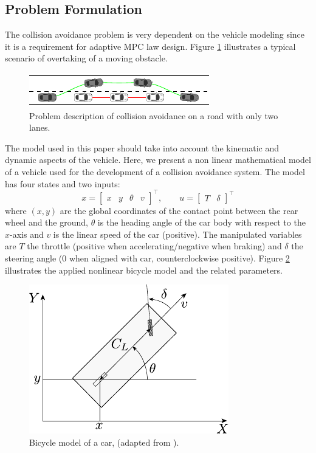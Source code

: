 \documentclass[conference,11pt]{IEEEtran}
\renewcommand{\vec}[1]{\ensuremath{\boldsymbol{\mathit{#1}}}}
\begin{document}
\subsection{Problem Formulation}
The collision avoidance problem is very dependent on the vehicle modeling since it is a requirement for  adaptive MPC law design. Figure \ref{fig:obstacleAvoidance} illustrates a typical scenario of overtaking of a moving obstacle.
\begin{figure}[H]
	\centering
	\includegraphics[width=1\columnwidth]{./figure/obstacleAvoidance/obstacleAvoidance.pdf}
	\caption{Problem description of collision avoidance on a road with only two lanes.}
	\label{fig:obstacleAvoidance}
\end{figure}
The model used in this paper should take into account the kinematic and dynamic aspects of the vehicle. Here, we present a non linear mathematical model of a vehicle used for the development of a collision avoidance system.
The model has four states and two inputs:
\[ 
\vec{x}=\begin{bmatrix}
   x&y&\theta&v 
  \end{bmatrix}^\intercal
,\qquad 
\vec{u}=\begin{bmatrix}
T&\delta 
\end{bmatrix}^\intercal
\]
where $(x,y)$ are the global coordinates of the contact point between the rear wheel and the ground, $\theta$ is the heading angle of the car body with respect to the $x$-axis and $v$ is the linear speed of the car (positive). The manipulated variables are $T$ the throttle (positive when accelerating/negative when braking) and $\delta$ the steering angle ($0$ when aligned with car, counterclockwise positive). Figure \ref{fig:car_model} illustrates the applied nonlinear bicycle model and the related parameters.
\begin{figure}[H]
	\centering
	\includegraphics[width=0.70\columnwidth]{./figure/car_model.pdf}
	\caption{Bicycle model of a car, (adapted from \cite{siciliano}).}
	\label{fig:car_model}
\end{figure}
\end{document}
